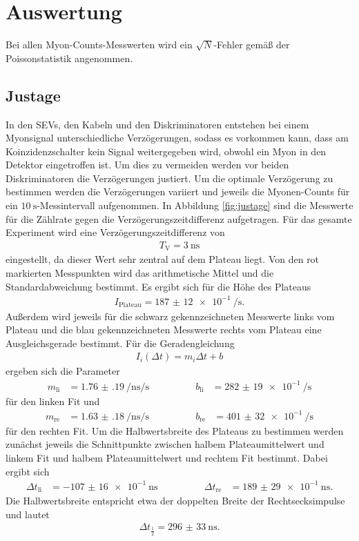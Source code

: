 \section{Auswertung}
\label{sec:Auswertung}

Bei allen Myon-Counts-Messwerten wird ein $\sqrt{N}$-Fehler gemäß der Poissonstatistik
angenommen.

\subsection{Justage}

In den SEVs, den Kabeln und den Diskriminatoren entstehen bei einem Myonsignal unterschiedliche Verzögerungen, sodass es vorkommen kann, dass
am Koinzidenzschalter kein Signal weitergegeben wird, obwohl ein Myon in den Detektor eingetroffen ist. Um dies zu vermeiden werden
vor beiden Diskriminatoren die Verzögerungen justiert. Um die optimale Verzögerung zu bestimmen werden die Verzögerungen variiert und jeweils die Myonen-Counts für ein
$\SI{10}{\second}$-Messintervall aufgenommen. In Abbildung \ref{fig:justage} sind die Messwerte für die Zählrate
gegen die Verzögerungszeitdifferenz aufgetragen. Für das gesamte Experiment wird eine Verzögerungszeitdifferenz von
\begin{align*}
  T_\text{V} = \SI{3}{\nano\second}
\end{align*}
eingestellt, da dieser Wert sehr zentral auf dem Plateau liegt. Von den rot markierten Messpunkten wird das arithmetische
Mittel und die Standardabweichung bestimmt. Es ergibt sich für die Höhe des Plateaus
\begin{align}
  I_\text{Plateau} = \SI{187(12)e-1}{\per\second}.
\end{align}
Außerdem wird jeweils für die schwarz gekennzeichneten Messwerte links vom Plateau und die blau gekennzeichneten Messwerte
rechts vom Plateau eine Ausgleichsgerade bestimmt. Für die Geradengleichung
\begin{align}
  I_i(\Delta t) = m_i \Delta t + b
\end{align}
ergeben sich die Parameter
\begin{align}
  m_\text{li} &= \SI{1.76(19)}{\per\nano\second\per\second} \qquad \qquad &b_\text{li} &= \SI{282(19)e-1}{\per\second}
\end{align}
für den linken Fit und
\begin{align}
  m_\text{re} &= \SI{1.63(18)}{\per\nano\second\per\second} \qquad \qquad &b_\text{re} &= \SI{401(32)e-1}{\per\second}
\end{align}
für den rechten Fit. Um die Halbwertsbreite des Plateaus zu bestimmen werden zunächst jeweils die Schnittpunkte zwischen
halbem Plateaumittelwert und linkem Fit und halbem Plateaumittelwert und rechtem Fit bestimmt. Dabei ergibt sich
\begin{align}
  \Delta t_\text{li} &= \SI{-107(16)e-1}{\nano\second} \qquad \qquad & \Delta t_\text{re} &= \SI{189(29)e-1}{\nano\second}.
\end{align}
Die Halbwertsbreite entspricht etwa der doppelten Breite der Rechtsecksimpulse und lautet
\begin{align}
  \Delta t_{\frac12} = \SI{296(33)}{\nano\second}.
\end{align}

